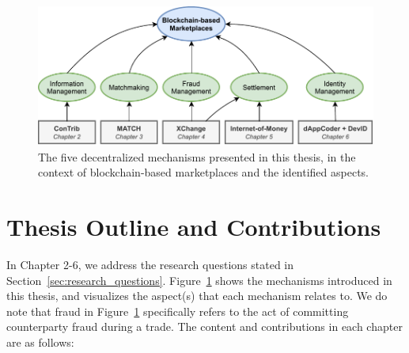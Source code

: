 



\begin{figure}[t]
	\centering
	\includegraphics[width=\linewidth]{introduction/assets/thesis_overview}
	\caption{The five decentralized mechanisms presented in this thesis, in the context of blockchain-based marketplaces and the identified aspects.}
	\label{fig:thesis_overview}
\end{figure}

\section{Thesis Outline and Contributions}
In Chapter 2-6, we address the research questions stated in Section~\ref{sec:research_questions}.
Figure~\ref{fig:thesis_overview} shows the mechanisms introduced in this thesis, and visualizes the aspect(s) that each mechanism relates to.
We do note that fraud in Figure~\ref{fig:thesis_overview} specifically refers to the act of committing counterparty fraud during a trade.
The content and contributions in each chapter are as follows:\\

